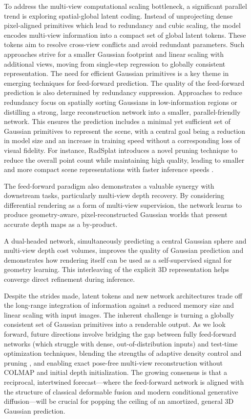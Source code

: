 \documentclass[11pt,a4paper]{article}
\begin{document}
To address the multi-view computational scaling bottleneck, a significant parallel trend is exploring spatial-global latent coding. Instead of unprojecting dense pixel-aligned primitives which lead to redundancy and cubic scaling, the model encodes multi-view information into a compact set of global latent tokens. These tokens aim to resolve cross-view conflicts and avoid redundant parameters. Such approaches strive for a smaller Gaussian footprint and linear scaling with additional views, moving from single-step regression to globally consistent representation. The need for efficient Gaussian primitives is a key theme in emerging techniques for feed-forward prediction. The quality of the feed-forward prediction is also determined by redundancy suppression. Approaches to reduce redundancy focus on spatially sorting Gaussians in low-information regions or distilling a strong, large reconstruction network into a smaller, parallel-friendly network. This ensures the prediction includes a minimal yet sufficient set of Gaussian primitives to represent the scene, with a central goal being a reduction in model size and an increase in training speed without a corresponding loss of visual fidelity. For instance, RadSplat introduces a novel pruning technique to reduce the overall point count while maintaining high quality, leading to smaller and more compact scene representations with faster inference speeds \cite{arxiv:2403.13806v1}.

The feed-forward paradigm also demonstrates a valuable synergy with downstream tasks, particularly multi-view depth recovery. By considering differential rendering as a form of multi-view supervision, the network learns to produce geometry-aware, pixel-reconstructed Gaussian worlds that present accurate depth maps as a by-product.

A dual-headed network, simultaneously predicting a central Gaussian sphere and multi-view depth cost volumes, improves the quality of Gaussian prediction and demonstrates how rendering itself can be used as a self-supervised signal for geometry learning. This interleaving of the explicit 3D representation helps converge direct refinement during inference.

Despite the strides made, latent tokens and new network architectures trade off the long-range integration of information against a reduced memory size and linear scaling with input images. The inherent challenge is turning a globally consistent set of Gaussian primitives into a renderable output. As we look forward, future directions involve bridging the gap between fully feed-forward networks (which struggle with dense, out-of-distribution inputs) and test-time optimization techniques, blending the strengths of adaptive density control and pruning \cite{arxiv:2510.26694v1}, and enabling exact pose-free multi-view reconstruction without COLMAP and initial depth initialization. The growing consensus is that a reciprocal, intertwined forecast---where the feed-forward network is aligned with the structure of classical deformable fusion and modern conditional generative diffusion---will be crucial for popping the ceiling of an amortized, general 3D Gaussian prediction.
\end{document}
